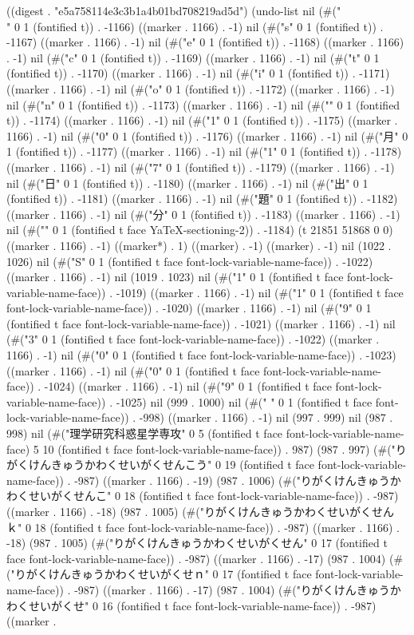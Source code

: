 
((digest . "e5a758114e3c3b1a4b01bd708219ad5d") (undo-list nil (#("\\" 0 1 (fontified t)) . -1166) ((marker . 1166) . -1) nil (#("s" 0 1 (fontified t)) . -1167) ((marker . 1166) . -1) nil (#("e" 0 1 (fontified t)) . -1168) ((marker . 1166) . -1) nil (#("c" 0 1 (fontified t)) . -1169) ((marker . 1166) . -1) nil (#("t" 0 1 (fontified t)) . -1170) ((marker . 1166) . -1) nil (#("i" 0 1 (fontified t)) . -1171) ((marker . 1166) . -1) nil (#("o" 0 1 (fontified t)) . -1172) ((marker . 1166) . -1) nil (#("n" 0 1 (fontified t)) . -1173) ((marker . 1166) . -1) nil (#("{" 0 1 (fontified t)) . -1174) ((marker . 1166) . -1) nil (#("1" 0 1 (fontified t)) . -1175) ((marker . 1166) . -1) nil (#("0" 0 1 (fontified t)) . -1176) ((marker . 1166) . -1) nil (#("月" 0 1 (fontified t)) . -1177) ((marker . 1166) . -1) nil (#("1" 0 1 (fontified t)) . -1178) ((marker . 1166) . -1) nil (#("7" 0 1 (fontified t)) . -1179) ((marker . 1166) . -1) nil (#("日" 0 1 (fontified t)) . -1180) ((marker . 1166) . -1) nil (#("出" 0 1 (fontified t)) . -1181) ((marker . 1166) . -1) nil (#("題" 0 1 (fontified t)) . -1182) ((marker . 1166) . -1) nil (#("分" 0 1 (fontified t)) . -1183) ((marker . 1166) . -1) nil (#("}" 0 1 (fontified t face YaTeX-sectioning-2)) . -1184) (t 21851 51868 0 0) ((marker . 1166) . -1) ((marker*) . 1) ((marker) . -1) ((marker) . -1) nil (1022 . 1026) nil (#("S" 0 1 (fontified t face font-lock-variable-name-face)) . -1022) ((marker . 1166) . -1) nil (1019 . 1023) nil (#("1" 0 1 (fontified t face font-lock-variable-name-face)) . -1019) ((marker . 1166) . -1) nil (#("1" 0 1 (fontified t face font-lock-variable-name-face)) . -1020) ((marker . 1166) . -1) nil (#("9" 0 1 (fontified t face font-lock-variable-name-face)) . -1021) ((marker . 1166) . -1) nil (#("3" 0 1 (fontified t face font-lock-variable-name-face)) . -1022) ((marker . 1166) . -1) nil (#("0" 0 1 (fontified t face font-lock-variable-name-face)) . -1023) ((marker . 1166) . -1) nil (#("0" 0 1 (fontified t face font-lock-variable-name-face)) . -1024) ((marker . 1166) . -1) nil (#("9" 0 1 (fontified t face font-lock-variable-name-face)) . -1025) nil (999 . 1000) nil (#(" " 0 1 (fontified t face font-lock-variable-name-face)) . -998) ((marker . 1166) . -1) nil (997 . 999) nil (987 . 998) nil (#("理学研究科惑星学専攻" 0 5 (fontified t face font-lock-variable-name-face) 5 10 (fontified t face font-lock-variable-name-face)) . 987) (987 . 997) (#("りがくけんきゅうかわくせいがくせんこう" 0 19 (fontified t face font-lock-variable-name-face)) . -987) ((marker . 1166) . -19) (987 . 1006) (#("りがくけんきゅうかわくせいがくせんこ" 0 18 (fontified t face font-lock-variable-name-face)) . -987) ((marker . 1166) . -18) (987 . 1005) (#("りがくけんきゅうかわくせいがくせんｋ" 0 18 (fontified t face font-lock-variable-name-face)) . -987) ((marker . 1166) . -18) (987 . 1005) (#("りがくけんきゅうかわくせいがくせん" 0 17 (fontified t face font-lock-variable-name-face)) . -987) ((marker . 1166) . -17) (987 . 1004) (#("りがくけんきゅうかわくせいがくせｎ" 0 17 (fontified t face font-lock-variable-name-face)) . -987) ((marker . 1166) . -17) (987 . 1004) (#("りがくけんきゅうかわくせいがくせ" 0 16 (fontified t face font-lock-variable-name-face)) . -987) ((marker . 